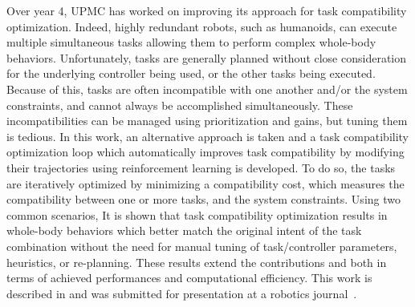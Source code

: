 Over year 4, UPMC has worked on improving its approach for task compatibility optimization. Indeed, highly redundant robots, such as humanoids, can execute multiple simultaneous tasks allowing them to perform complex whole-body behaviors. Unfortunately, tasks are generally planned without close consideration for the underlying controller being used, or the other tasks being executed. Because of this, tasks are often incompatible with one another and/or the system constraints, and cannot always be accomplished simultaneously. These incompatibilities can be managed using prioritization and gains, but tuning them is tedious. In this work, an alternative approach is taken and a task compatibility optimization loop which automatically improves task compatibility by modifying their trajectories using reinforcement learning is developed. To do so, the tasks are iteratively optimized by minimizing a compatibility cost, which measures the compatibility between one or more tasks, and the system constraints. Using two common scenarios, It is shown that task compatibility optimization results in whole-body behaviors which better match the original intent of the task combination without the need for manual tuning of task/controller parameters, heuristics, or re-planning. These results extend the contributions \cite{lober-HUMANOIDS2014} and \cite{lober_IROS2015} both in terms of achieved performances and computational efficiency. This work is described in \cite{deliverable33}  and was submitted for presentation at a robotics journal~\cite{lober2017RAL-IROS}.

